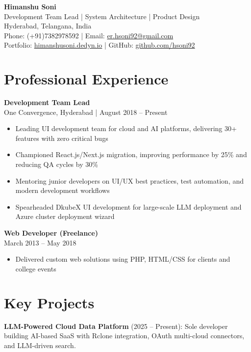 \documentclass[10pt, a4paper]{article}
\newcommand{\smallgray}[1]{\textcolor{darkgray!90}{\small #1}}
\begin{document}
\begin{center}
    {\LARGE\bfseries Himanshu Soni} \\
    \vspace{1pt}
    {\normalsize Development Team Lead | System Architecture | Product Design} \\
    \vspace{1pt}
    Hyderabad, Telangana, India \\
    Phone: (+91)7382978592 | Email: \href{mailto:er.hsoni92@gmail.com}{er.hsoni92@gmail.com} \\
    Portfolio: \href{http://himanshusoni.dedyn.io}{himanshusoni.dedyn.io} | GitHub: \href{https://github.com/hsoni92}{github.com/hsoni92}
\end{center}

\hrulefill
\vspace{3pt}

\section{Professional Experience}
\textbf{Development Team Lead} \\
\smallgray{One Convergence, Hyderabad | August 2018 -- Present}
\begin{itemize}
    \item Leading UI development team for cloud and AI platforms, delivering 30+ features with zero critical bugs
    \item Championed React.js/Next.js migration, improving performance by 25\% and reducing QA cycles by 30\%
    \item Mentoring junior developers on UI/UX best practices, test automation, and modern development workflows
    \item Spearheaded DkubeX UI development for large-scale LLM deployment and Azure cluster deployment wizard
\end{itemize}

\textbf{Web Developer (Freelance)} \\
\smallgray{March 2013 -- May 2018}
\begin{itemize}
    \item Delivered custom web solutions using PHP, HTML/CSS for clients and college events
\end{itemize}


\section{Key Projects}
\textbf{LLM-Powered Cloud Data Platform} (2025 -- Present): Sole developer building AI-based SaaS with Rclone integration, OAuth multi-cloud connectors, and LLM-driven search.
\end{document}
